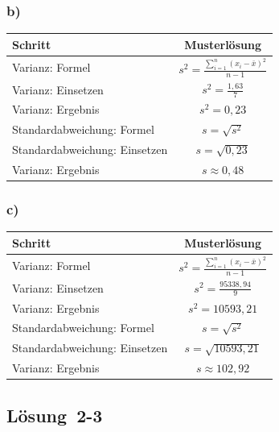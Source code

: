 \documentclass[
  11pt,
  ngerman,
  a4paper,
]{report}
\begin{document}
\hypertarget{b-3}{%
\subsubsection{b)}\label{b-3}}

\begin{table}[H]
\centering
\begin{tabular}{lc}
\toprule
Schritt & Musterlösung\\
\midrule
Varianz: Formel & $s^2=\frac{\sum\limits_{i=1}^{n}(x_{i}-\bar{x})^2}{n-1}$\\
Varianz: Einsetzen & $s^2=\frac{1{,}63}{7}$\\
Varianz: Ergebnis & $s^2=0{,}23$\\
Standardabweichung: Formel & $s=\sqrt{s^2}$\\
Standardabweichung: Einsetzen & $s=\sqrt{0{,}23}$\\
Varianz: Ergebnis & $s\approx0{,}48$\\
\bottomrule
\end{tabular}
\end{table}

\hypertarget{c-3}{%
\subsubsection{c)}\label{c-3}}

\begin{table}[H]
\centering
\begin{tabular}{lc}
\toprule
Schritt & Musterlösung\\
\midrule
Varianz: Formel & $s^2=\frac{\sum\limits_{i=1}^{n}(x_{i}-\bar{x})^2}{n-1}$\\
Varianz: Einsetzen & $s^2=\frac{95338{,}94}{9}$\\
Varianz: Ergebnis & $s^2=10593{,}21$\\
Standardabweichung: Formel & $s=\sqrt{s^2}$\\
Standardabweichung: Einsetzen & $s=\sqrt{10593{,}21}$\\
Varianz: Ergebnis & $s\approx102{,}92$\\
\bottomrule
\end{tabular}
\end{table}

\hypertarget{loesung-2-3}{%
\subsection{Lösung~2-3}\label{loesung-2-3}}
\end{document}
